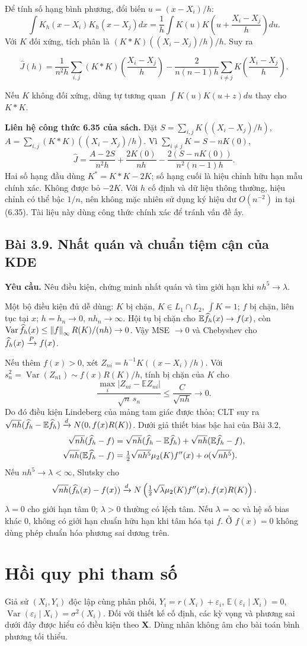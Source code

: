 \documentclass[11pt,a4paper]{article}
\newcommand{\E}{\mathbb E}\newcommand{\Pp}{\mathbb P}
\DeclareMathOperator{\Var}{Var}\DeclareMathOperator{\Cov}{Cov}
\newcommand{\dto}{\xrightarrow{d}}\newcommand{\pto}{\xrightarrow{P}}
\newcommand{\norm}[1]{\left\lVert#1\right\rVert}
\newcommand{\prob}[3]{\subsection{Bài #1. #2}\label{b:#1}\textbf{Yêu cầu.} #3\par}
\begin{document}
Để tính số hạng bình phương, đổi biến $u=(x-X_i)/h$:
\[
\int K_h(x-X_i)K_h(x-X_j)dx
=\frac1h\int K(u)K\left(u+\frac{X_i-X_j}{h}\right)du.
\]
Với $K$ đối xứng, tích phân là $(K*K)((X_i-X_j)/h)/h$. Suy ra
\begin{result}
\[
\widehat J(h)=\frac1{n^2h}\sum_{i,j}(K*K)\!\left(\frac{X_i-X_j}{h}\right)
-\frac2{n(n-1)h}\sum_{i\ne j}K\!\left(\frac{X_i-X_j}{h}\right).
\]
\end{result}
Nếu $K$ không đối xứng, dùng tự tương quan $\int K(u)K(u+z)du$ thay cho $K*K$.

\textbf{Liên hệ công thức 6.35 của sách.} Đặt $S=\sum_{i,j}K((X_i-X_j)/h)$, $A=\sum_{i,j}(K*K)((X_i-X_j)/h)$. Vì $\sum_{i\ne j}K=S-nK(0)$,
\[
\widehat J=\frac{A-2S}{n^2h}+\frac{2K(0)}{nh}
-\frac{2(S-nK(0))}{n^2(n-1)h}.
\]
Hai số hạng đầu dùng $K^*=K*K-2K$; số hạng cuối là hiệu chỉnh hữu hạn mẫu chính xác. Không được bỏ $-2K$. Với $h$ cố định và dữ liệu thông thường, hiệu chỉnh có thể bậc $1/n$, nên không mặc nhiên sử dụng ký hiệu dư $O(n^{-2})$ in tại (6.35). Tài liệu này dùng công thức chính xác để tránh vấn đề ấy.

\prob{3.9}{Nhất quán và chuẩn tiệm cận của KDE}{Nêu điều kiện, chứng minh nhất quán và tìm giới hạn khi $nh^5\to\lambda$.}
Một bộ điều kiện đủ dễ dùng: $K$ bị chặn, $K\in L_1\cap L_2$, $\int K=1$; $f$ bị chặn, liên tục tại $x$; $h=h_n\to0$, $nh_n\to\infty$. Hội tụ bị chặn cho
$\E\fh(x)\to f(x)$, còn $\Var\fh(x)\le \norm f_\infty R(K)/(nh)\to0$. Vậy MSE $\to0$ và Chebyshev cho $\fh(x)\pto f(x)$.

Nếu thêm $f(x)>0$, xét $Z_{ni}=h^{-1}K((x-X_i)/h)$. Với $s_n^2=\Var(Z_{n1})\sim f(x)R(K)/h$, tính bị chặn của $K$ cho
\[
\frac{\max_i|Z_{ni}-\E Z_{ni}|}{\sqrt n\,s_n}
\le\frac{C}{\sqrt{nh}}\longrightarrow0.
\]
Do đó điều kiện Lindeberg của mảng tam giác được thỏa; CLT suy ra
$\sqrt{nh}(\fh-\E\fh)\dto N(0,f(x)R(K))$.
Dưới giả thiết bias bậc hai của Bài 3.2,
\begin{align*}
\sqrt{nh}(\fh-f)
&=\sqrt{nh}(\fh-\E\fh)+\sqrt{nh}(\E\fh-f),\\
\sqrt{nh}(\E\fh-f)
&=\tfrac12\sqrt{nh^5}\mu_2(K)f''(x)+o(\sqrt{nh^5}).
\end{align*}
Nếu $nh^5\to\lambda<\infty$, Slutsky cho
\[
\sqrt{nh}(\fh(x)-f(x))\dto N\left(\tfrac12\sqrt\lambda\mu_2(K)f''(x),f(x)R(K)\right).
\]
$\lambda=0$ cho giới hạn tâm 0; $\lambda>0$ thường có lệch tâm. Nếu $\lambda=\infty$ và hệ số bias khác 0, không có giới hạn chuẩn hữu hạn khi tâm hóa tại $f$. Ở $f(x)=0$ không dùng phép chuẩn hóa phương sai dương trên.
\clearpage
\section{Hồi quy phi tham số}
Giả sử $(X_i,Y_i)$ độc lập cùng phân phối, $Y_i=r(X_i)+\varepsilon_i$, $\E(\varepsilon_i\mid X_i)=0$, $\Var(\varepsilon_i\mid X_i)=\sigma^2(X_i)$. Đối với thiết kế cố định, các kỳ vọng và phương sai dưới đây được hiểu có điều kiện theo $\mathbf X$. Dùng nhân không âm cho bài toán bình phương tối thiểu.
\end{document}
